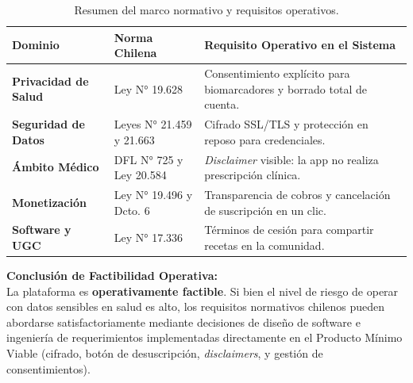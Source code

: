 \documentclass[12pt]{article}
\begin{document}
\newpage
\begin{table}[h!]
    \centering
    \renewcommand{\arraystretch}{1.5}
    \begin{tabular}{|m{3.5cm}|m{4cm}|m{7cm}|}
        \hline
        \rowcolor[HTML]{EFEFEF}
        \textbf{Dominio} & \textbf{Norma Chilena} & \textbf{Requisito Operativo en el Sistema} \\ \hline
        \textbf{Privacidad de Salud} & Ley N° 19.628 & Consentimiento explícito para biomarcadores y borrado total de cuenta. \\ \hline
        \textbf{Seguridad de Datos} & Leyes N° 21.459 y 21.663 & Cifrado SSL/TLS y protección en reposo para credenciales. \\ \hline
        \textbf{Ámbito Médico} & DFL N° 725 y Ley 20.584 & \textit{Disclaimer} visible: la app no realiza prescripción clínica. \\ \hline
        \textbf{Monetización} & Ley N° 19.496 y Dcto. 6 & Transparencia de cobros y cancelación de suscripción en un clic. \\ \hline
        \textbf{Software y UGC} & Ley N° 17.336 & Términos de cesión para compartir recetas en la comunidad. \\ \hline
    \end{tabular}
    \caption{Resumen del marco normativo y requisitos operativos.}
    \label{tab:resumen_normativo}
\end{table}

\textbf{Conclusión de Factibilidad Operativa:}\\
La plataforma es \textbf{operativamente factible}. Si bien el nivel de riesgo de operar con datos sensibles en salud es alto, los requisitos normativos chilenos pueden abordarse satisfactoriamente mediante decisiones de diseño de software e ingeniería de requerimientos implementadas directamente en el Producto Mínimo Viable (cifrado, botón de desuscripción, \textit{disclaimers}, y gestión de consentimientos).
\newpage
\end{document}
